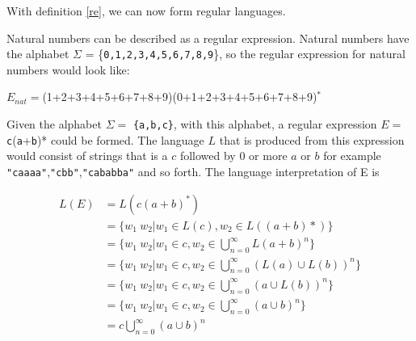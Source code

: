 With definition \ref{re}, we can now form regular languages. 
\begin{myex}Natural numbers can be described as a regular expression. Natural numbers have the alphabet $\Sigma$ = \{{\tt 0,1,2,3,4,5,6,7,8,9}\}, so the regular expression for natural numbers would look like:
\begin{center}
$E_{nat} = $(1+2+3+4+5+6+7+8+9)(0+1+2+3+4+5+6+7+8+9)$^*$
\end{center}
\end{myex}

\begin{myex}
Given the alphabet $\Sigma =$ {\tt\{a,b,c\}}, with this alphabet, a regular expression $E =$ {\tt c}({\tt a}+{\tt b})* could be formed. The language $L$ that is produced from this expression would consist of strings that is a $c$ followed by $0$ or more $a$ or $b$ for example {\tt "caaaa"},{\tt "cbb"},{\tt "cababba"} and so forth. The language interpretation of E is 
\begin{center}
\begin{align*}
L(E) &= L(c(a+b)^*)\\
	 &= \{w_1 ~w_2|w_1 \in L(c),w_2 \in L((a+b)*)\}\\
	 &= \{w_1~ w_2|w_1 \in c, w_2 \in \bigcup\limits_{n=0}^\infty L(a+b)^n \}\\
	 &= \{w_1~ w_2|w_1 \in c, w_2 \in \bigcup\limits_{n=0}^\infty (L(a) \cup L(b))^n \}\\
	 &= \{w_1~ w_2|w_1 \in c, w_2 \in \bigcup\limits_{n=0}^\infty (a \cup L(b))^n \}\\
	 &= \{w_1~ w_2|w_1 \in c, w_2 \in \bigcup\limits_{n=0}^\infty (a \cup b)^n \}\\
	 &= c \bigcup\limits_{n=0}^\infty (a \cup b)^n 
\end{align*}
\end{center}
\label{reinter}
\end{myex}